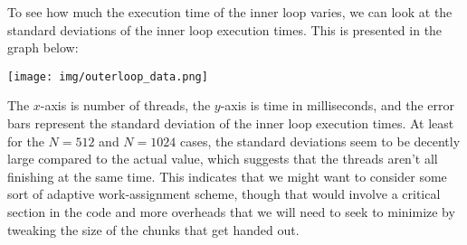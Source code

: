 \documentclass{article}
\begin{document}
To see how much the execution time of the inner loop varies, we can look at the standard deviations of the inner loop execution times. This is presented in the graph below:

\texttt{[image: img/outerloop\_data.png]}

The $x$-axis is number of threads, the $y$-axis is time in milliseconds, and the error bars represent the standard deviation of the inner loop execution times. At least for the $N=512$ and $N=1024$ cases, the standard deviations seem to be decently large compared to the actual value, which suggests that the threads aren't all finishing at the same time. This indicates that we might want to consider some sort of adaptive work-assignment scheme, though that would involve a critical section in the code and more overheads that we will need to seek to minimize by tweaking the size of the chunks that get handed out.
\end{document}
